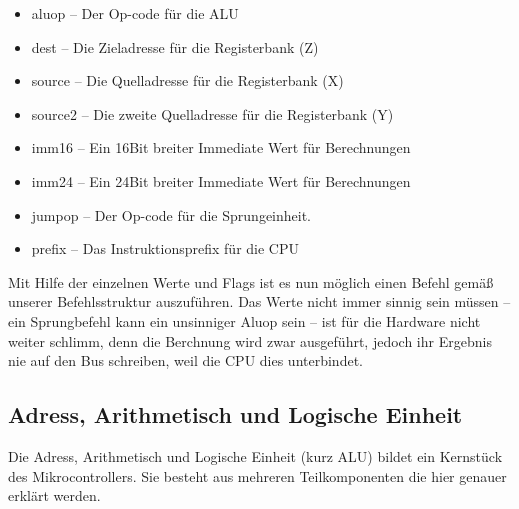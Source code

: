 \begin{itemize}
  \item aluop -- Der Op-code für die ALU
  \item dest --  Die Zieladresse für die Registerbank (Z)
  \item source -- Die Quelladresse für die Registerbank (X)
  \item source2 -- Die zweite Quelladresse für die Registerbank (Y)
  \item imm16 -- Ein 16Bit breiter Immediate Wert für Berechnungen
  \item imm24 -- Ein 24Bit breiter Immediate Wert für Berechnungen
  \item jumpop -- Der Op-code für die Sprungeinheit.
  \item prefix -- Das Instruktionsprefix für die CPU
\end{itemize}
Mit Hilfe der einzelnen Werte und Flags ist es nun möglich einen Befehl gemäß unserer Befehlsstruktur auszuführen. Das Werte nicht immer sinnig sein müssen -- ein Sprungbefehl kann ein unsinniger Aluop sein -- ist für die Hardware nicht weiter schlimm, denn die Berchnung wird zwar ausgeführt, jedoch ihr Ergebnis nie auf den Bus schreiben, weil die CPU dies unterbindet.
\subsection{Adress, Arithmetisch und Logische Einheit}
Die Adress, Arithmetisch und Logische Einheit (kurz ALU) bildet ein Kernstück des Mikrocontrollers. Sie besteht aus mehreren Teilkomponenten die hier genauer erklärt werden.
